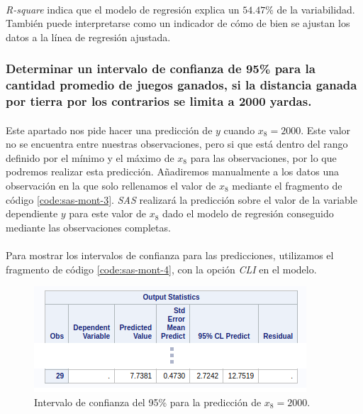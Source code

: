 \documentclass{article}
\begin{document}
  \paragraph{}
  \textit{R-square} indica que el modelo de regresión explica un $54.47\%$ de la variabilidad. También puede interpretarse como un indicador de cómo de bien se ajustan los datos a la línea de regresión ajustada.


  \subsubsection{Determinar un intervalo de confianza de 95\% para la cantidad promedio de juegos ganados, si la distancia ganada por tierra por los contrarios se limita a 2000 yardas.}

  \paragraph{}
  Este apartado nos pide hacer una predicción de $y$ cuando $x_8=2000$. Este valor no se encuentra entre nuestras observaciones, pero si que está dentro del rango definido por el mínimo y el máximo de $x_8$ para las observaciones, por lo que podremos realizar esta predicción. Añadiremos manualmente a los datos una observación en la que solo rellenamos el valor de $x_8$ mediante el fragmento de código \ref{code:sas-mont-3}. \textit{SAS} realizará la predicción sobre el valor de la variable dependiente $y$ para este valor de $x_8$ dado el modelo de regresión conseguido mediante las observaciones completas.

  \paragraph{}
  Para mostrar los intervalos de confianza para las predicciones, utilizamos el fragmento de código \ref{code:sas-mont-4}, con la opción \textit{CLI} en el modelo.

  \begin{figure}[H]
    \centering
    \includegraphics[width=.5\linewidth]{img/montgomery/prediccion2000.png}
    \caption{Intervalo de confianza del 95\% para la predicción de $x_8=2000$.}
    \label{img:mont-prediccion2000}
  \end{figure}
\end{document}
